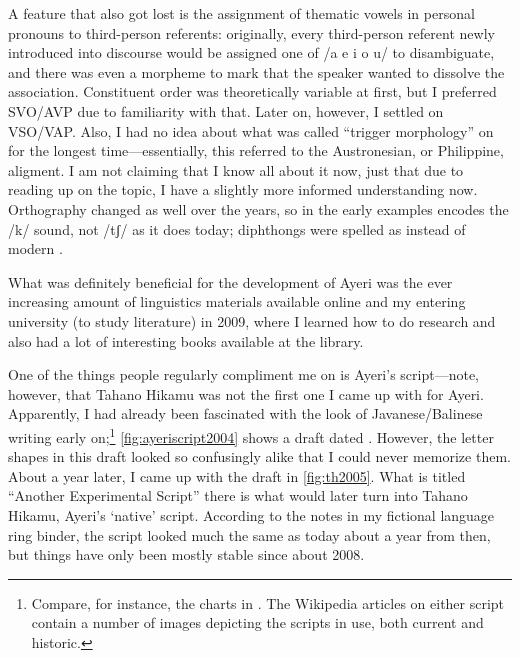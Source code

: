 A feature that also got lost is the assignment of thematic vowels in personal
pronouns to third-person referents: originally, every third-person referent
newly introduced into discourse would be assigned one of /a e i o u/ to
disambiguate, and there was even a morpheme to mark that the speaker wanted to
dissolve the association. Constituent order was theoretically variable at
first, but I preferred SVO/AVP due to familiarity with that. Later on, however,
I settled on VSO/VAP. Also, I had no idea about what was called ``trigger
morphology'' on  for the longest time---essentially, this
referred to the Austronesian, or Philippine, aligment. I am not claiming that I
know all about it now, just that due to reading up on the topic, I have a
slightly more informed understanding now. Orthography changed as well over the
years, so  in the early examples encodes the /k/ sound, not /tʃ/ as it
does today; diphthongs were spelled as  instead of modern .

What was definitely beneficial for the development of Ayeri was the ever 
increasing amount of linguistics materials available online and my entering 
university (to study literature) in 2009, where I learned how to do research 
and also had a lot of interesting books available at the library.

One of the things people regularly compliment me on is Ayeri's script---note,
however, that Tahano Hikamu was not the first one I came
up with for Ayeri. Apparently, I had already been fascinated with the look of
Javanese/Balinese writing early on;\footnote{Compare, for instance, the charts
in \citet{kuipersmcdermott1996}. The Wikipedia articles on either script
contain a number of images depicting the scripts in use, both current and
historic.} \autoref{fig:ayeriscript2004} shows a draft dated
. However, the letter shapes in this draft looked so
confusingly alike that I could never memorize them. About a year later, I came
up with the draft in \autoref{fig:th2005}. What is titled ``Another
Experimental Script'' there is what would later turn into Tahano Hikamu,
Ayeri's `native' script. According to the notes in my fictional language ring
binder, the script looked much the same as today about a year from then, but
things have only been mostly stable since about 2008.

